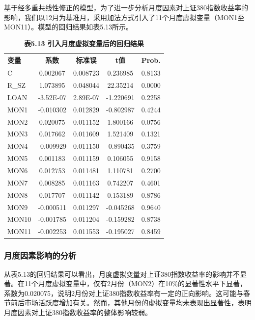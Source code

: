 \documentclass[12pt, a4paper]{article}
\numberwithin{equation}{section}
\begin{document}
基于经多重共线性修正的模型，为了进一步分析月度因素对上证380指数收益率的影响，我们以12月为基准月，采用加法方式引入了11个月度虚拟变量（MON1至MON11）。模型的回归结果如表5.13所示。

\begin{table}[h!]
    \centering
    \captionsetup{labelformat=empty}
    \caption{\textbf{\fontsize{9pt}{11pt}\selectfont 表5.13 引入月度虚拟变量后的回归结果}}
    \begin{tabular}{lcccc}
        \toprule
        变量    & 系数        & 标准误      & t值        & Prob.  \\
        \midrule
        C     & 0.002067  & 0.008723 & 0.236985  & 0.8133 \\
        R\_SZ & 1.073895  & 0.048044 & 22.35214  & 0.0000 \\
        LOAN  & -3.52E-07 & 2.89E-07 & -1.220691 & 0.2258 \\
        MON1  & -0.010302 & 0.012829 & -0.802987 & 0.4244 \\
        MON2  & 0.020075  & 0.011152 & 1.800166  & 0.0756 \\
        MON3  & 0.017662  & 0.011609 & 1.521409  & 0.1321 \\
        MON4  & -0.009929 & 0.011150 & -0.890435 & 0.3759 \\
        MON5  & 0.001183  & 0.011159 & 0.106055  & 0.9158 \\
        MON6  & 0.012753  & 0.011481 & 1.110781  & 0.2700 \\
        MON7  & 0.008285  & 0.011163 & 0.742207  & 0.4601 \\
        MON8  & 0.017707  & 0.011142 & 0.153189  & 0.8786 \\
        MON9  & -0.000511 & 0.011297 & -0.045268 & 0.9640 \\
        MON10 & -0.001785 & 0.011204 & -0.159282 & 0.8738 \\
        MON11 & -0.002253 & 0.011553 & -0.195027 & 0.8459 \\
        \bottomrule
    \end{tabular}
\end{table}

\subsubsection{月度因素影响的分析}

从表5.13的回归结果可以看出，月度虚拟变量对上证380指数收益率的影响并不显著。在11个月度虚拟变量中，仅有2月份（MON2）在10\%的显著性水平下显著，系数为0.020075，说明2月份对上证380指数收益率有一定的正向影响。这可能与春节前后市场活跃度增加有关。然而，其他月份的虚拟变量均未表现出显著性，表明月度因素对上证380指数收益率的整体影响较弱。
\end{document}

